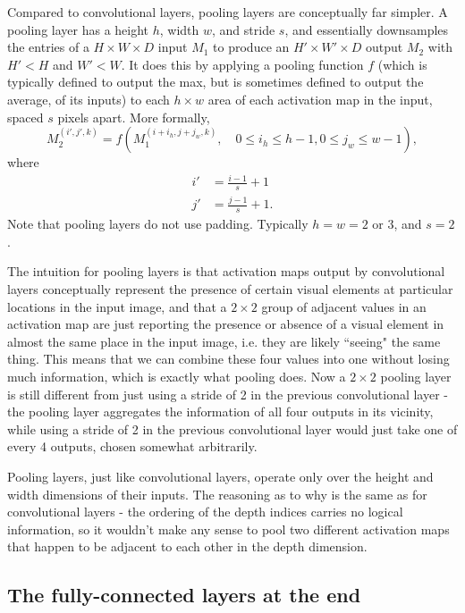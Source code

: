 Compared to convolutional layers, pooling layers are conceptually far simpler. A pooling layer has a height $h$, width $w$, and stride $s$, and essentially downsamples the entries of a $H \times W \times D$ input $M_1$ to produce an $H' \times W' \times D$ output $M_2$ with $H' < H$ and $W' < W$. It does this by applying a pooling function $f$ (which is typically defined to output the max, but is sometimes defined to output the average, of its inputs) to each $h \times w$ area of each activation map in the input, spaced $s$ pixels apart. More formally,
$$M_2^{(i', j', k)} = f\left(M_1^{(i + i_h, j + j_w, k)},\quad 0 \le i_h \le h - 1, 0 \le j_w \le w - 1\right),$$
where
\begin{align*}
    i' &= \frac{i - 1}{s} + 1 \\
    j' &= \frac{j - 1}{s} + 1.
\end{align*}
Note that pooling layers do not use padding. Typically $h = w = 2$ or 3, and $s = 2$.

The intuition for pooling layers is that activation maps output by convolutional layers conceptually represent the presence of certain visual elements at particular locations in the input image, and that a $2 \times 2$ group of adjacent values in an activation map are just reporting the presence or absence of a visual element in almost the same place in the input image, i.e. they are likely ``seeing" the same thing. This means that we can combine these four values into one without losing much information, which is exactly what pooling does. Now a $2 \times 2$ pooling layer is still different from just using a stride of 2 in the previous convolutional layer - the pooling layer aggregates the information of all four outputs in its vicinity, while using a stride of 2 in the previous convolutional layer would just take one of every 4 outputs, chosen somewhat arbitrarily.

Pooling layers, just like convolutional layers, operate only over the height and width dimensions of their inputs. The reasoning as to why is the same as for convolutional layers - the ordering of the depth indices carries no logical information, so it wouldn't make any sense to pool two different activation maps that happen to be adjacent to each other in the depth dimension.

\subsection{The fully-connected layers at the end}

